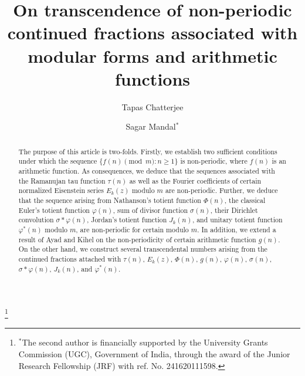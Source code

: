 \documentclass[12pt,reqno]{amsart}
\begin{document}
\title[On transcendence of non-periodic continued fractions associated with modular forms and arithmetic functions]{On transcendence of non-periodic continued fractions associated with modular forms and arithmetic functions}

\author[Tapas Chatterjee]{Tapas Chatterjee}

\address{%
Department of Mathematics,\\Indian Institute of Technology Ropar, Punjab, India.}



\author{Sagar Mandal$^{*}$}
\address{Department of Mathematics,\\Indian Institute of Technology Ropar, Punjab, India.}
\thanks{$^{*}$The second author is financially supported by the University Grants Commission (UGC), Government of India, through the award of the Junior Research Fellowship (JRF) with ref. No. 241620111598.}

	
	
	
\maketitle
    
    \begin{abstract}
The purpose of this article is two-folds. Firstly, we establish two sufficient conditions under which the sequence $\{f(n)\pmod{m}: n\geq1\}$ is non-periodic, where $f(n)$ is an arithmetic function. As consequences, we deduce that the sequences associated with the Ramanujan tau function $\tau(n)$ as well as the Fourier coefficients of certain normalized Eisenstein series $E_k(z)$ modulo $m$ are non-periodic. Further, we deduce that the sequence arising from Nathanson’s totient function $\Phi(n)$, the classical Euler's totient function $\varphi(n)$, sum of divisor function $\sigma(n)$, their Dirichlet convolution $\sigma * \varphi(n)$, Jordan's totient function $J_k(n)$, and unitary totient function $\varphi^*(n)$ modulo  $m$, are non-periodic for certain modulo $m$. In addition, we extend a result of Ayad and Kihel \cite{r1} on the non-periodicity of certain arithmetic function $g(n)$. On the other hand, we construct several transcendental numbers arising from the continued fractions attached with $\tau(n)$, $E_k(z)$, $\Phi(n)$, $g(n)$, $\varphi(n)$, $\sigma(n)$, $\sigma * \varphi(n)$, $J_k(n)$, and $\varphi^*(n)$. 
\end{abstract}
\end{document}
